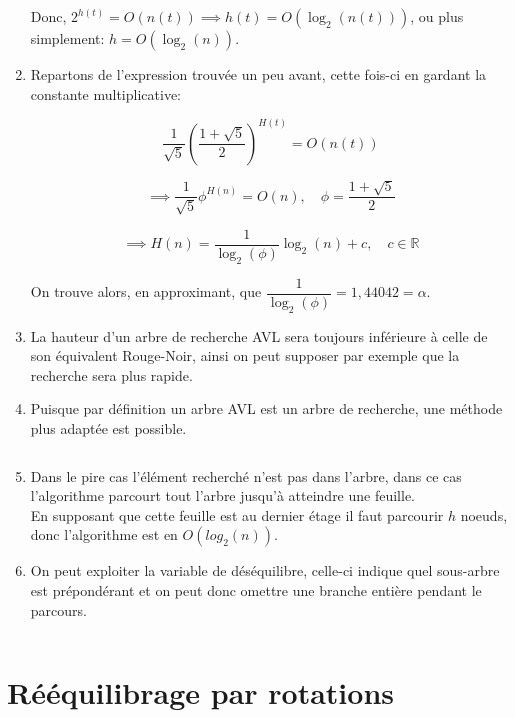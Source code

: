 \documentclass[article,11pt]{article}
\newcommand{\eqencld}[1]{
    \begin{equation*}#1\end{equation*}
}
\newcommand{\bgp}[1]{
    \left(#1\right)
}
\begin{document}
\begin{enumerate}
Donc, $2^{h(t)}=O(n(t))\implies h(t)=O(\log_{2}(n(t)))$, ou plus simplement: $h=O(\log_{2}(n))$.
\item Repartons de l'expression trouvée un peu avant, cette fois-ci en gardant la constante multiplicative:
\eqencld{\dfrac{1}{\sqrt{5}}\bgp{\dfrac{1+\sqrt{5}}{2}}^{H(t)}=O(n(t))}
\eqencld{\implies\dfrac{1}{\sqrt{5}}\phi^{H(n)}=O(n),\hspace{1em}\phi=\dfrac{1+\sqrt{5}}{2}}
\eqencld{\implies H(n)=\dfrac{1}{\log_{2}(\phi)}\log_{2}(n)+c,\hspace{1em}c\in\mathbb{R}}
On trouve alors, en approximant, que $\dfrac{1}{\log_{2}(\phi)}=1{,}44042=\alpha$.
\item La hauteur d'un arbre de recherche AVL sera toujours inférieure à celle de son équivalent Rouge-Noir, ainsi on peut supposer par exemple que la recherche sera plus rapide.
\item Puisque par définition un arbre AVL est un arbre de recherche, une méthode plus adaptée est possible.
\inputminted[fontsize=\small,firstline=25,lastline=27]{ocaml}{part2.ml}
\item Dans le pire cas l'élément recherché n'est pas dans l'arbre, dans ce cas l'algorithme parcourt tout l'arbre jusqu'à atteindre une feuille.\\
En supposant que cette feuille est au dernier étage il faut parcourir $h$ noeuds, donc l'algorithme est en $O(log_{2}(n))$.
\item On peut exploiter la variable de déséquilibre, celle-ci indique quel sous-arbre est prépondérant et on peut donc omettre une branche entière pendant le parcours.
\inputminted[fontsize=\small,firstline=28,lastline=30]{ocaml}{part2.ml}
\end{enumerate}

\section{Rééquilibrage par rotations}
\end{document}
